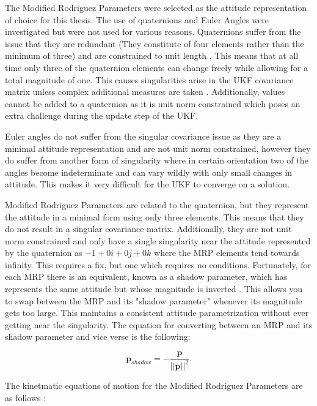 The Modified Rodriguez Parameters were selected as the attitude representation of choice for this thesis. The use of quaternions and Euler Angles were investigated but were not used for various reasons. Quaternions suffer from the issue that they are redundant (They constitute of four elements rather than the minimum of three) and are constrained to unit length \cite{MRPs}. This means that at all time only three of the quaternion elements can change freely while allowing for a total magnitude of one. This causes singularities arise in the UKF covariance matrix unless complex additional measures are taken \cite{MRPs} \cite{Linares_data_fusion}. Additionally, values cannot be added to a quaternion as it is unit norm constrained which poses an extra challenge during the update step of the UKF.

Euler angles do not suffer from the singular covariance issue as they are a minimal attitude representation and are not unit norm constrained, however they do suffer from another form of singularity where in certain orientation two of the angles become indeterminate and can vary wildly with only small changes in attitude. This makes it very difficult for the UKF to converge on a solution.

Modified Rodriguez Parameters are related to the quaternion, but they represent the attitude in a minimal form using only three elements. This means that they do not result in a singular covariance matrix. Additionally, they are not unit norm constrained and only have a single singularity near the attitude represented by the quaternion as $-1 + 0i + 0j + 0k$ where the MRP elements tend towards infinity. This requires a fix, but one which requires no conditions. Fortunately, for each MRP there is an equivalent, known as a shadow parameter, which has represents the same attitude but whose magnitude is inverted \cite{MRPs}. This allows you to swap between the MRP and its "shadow parameter" whenever its magnitude gets too large. This maintains a consistent attitude parametrization without ever getting near the singularity. The equation for converting between an MRP and its shadow parameter and vice verse is the following:

\begin{equation}\label{shadow_parameters}
\bm{p}_{shadow} = -\frac{\bm{p}}{||\bm{p}||^2}.
\end{equation}

The kinetmatic equations of motion for the Modified Rodriguez Parameters are as follows \cite{Crassidis_MRPs}:

